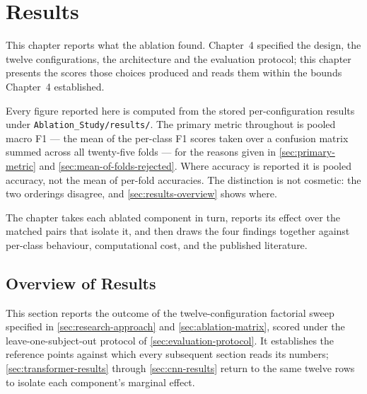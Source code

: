 %
%

\chapter{Results}
\label{ch:results}

This chapter reports what the ablation found. Chapter~4 specified the design, the twelve configurations, the architecture and the evaluation protocol; this chapter presents the scores those choices produced and reads them within the bounds Chapter~4 established.

Every figure reported here is computed from the stored per-configuration results under \texttt{Ablation\_Study/results/}. The primary metric throughout is pooled macro F1 --- the mean of the per-class F1 scores taken over a confusion matrix summed across all twenty-five folds --- for the reasons given in \autoref{sec:primary-metric} and \autoref{sec:mean-of-folds-rejected}. Where accuracy is reported it is pooled accuracy, not the mean of per-fold accuracies. The distinction is not cosmetic: the two orderings disagree, and \autoref{sec:results-overview} shows where.

The chapter takes each ablated component in turn, reports its effect over the matched pairs that isolate it, and then draws the four findings together against per-class behaviour, computational cost, and the published literature.


\section{Overview of Results}
\label{sec:results-overview}

This section reports the outcome of the twelve-configuration factorial sweep specified in \autoref{sec:research-approach} and \autoref{sec:ablation-matrix}, scored under the leave-one-subject-out protocol of \autoref{sec:evaluation-protocol}. It establishes the reference points against which every subsequent section reads its numbers; \autoref{sec:transformer-results} through \autoref{sec:cnn-results} return to the same twelve rows to isolate each component's marginal effect.


